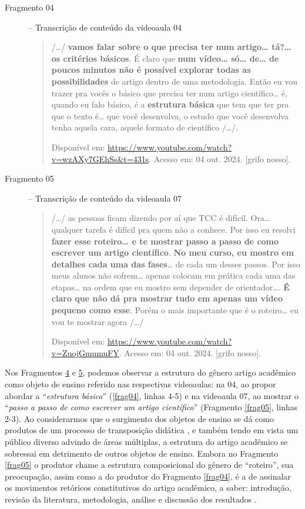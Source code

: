 \begin{description}
    \item[Fragmento 04\label{frag04}] -- Transcrição de conteúdo da videoaula 04

\begin{quote}
/\ldots/ \textbf{vamos falar sobre o que precisa ter num artigo\ldots{}
tá?\ldots{} os critérios básicos}. É claro que \textbf{num vídeo\ldots{}
só\ldots{} de\ldots{} de poucos minutos não é possível explorar todas as
possibilidades} de artigo dentro de uma metodologia. Então eu vou trazer
pra vocês o básico que precisa ter num artigo científico\ldots{} é,
quando eu falo básico, é a \textbf{estrutura básica} que tem que ter pra
que o texto é\ldots{} que você desenvolva, o estudo que você desenvolva
tenha aquela cara, aquele formato de científico /\ldots/.

Disponível em:
\url{https://www.youtube.com/watch?v=wzAXy7GEhSs\&t=431s}.
Acesso em: 04 out. 2024. {[}grifo nosso{]}.
\end{quote}

    \item[Fragmento 05\label{frag05}] -- Transcrição de conteúdo da videoaula 07

\begin{quote}
/\ldots/ as pessoas ficam dizendo por aí que TCC é difícil. Ora\ldots{}
qualquer tarefa é difícil pra quem não a conhece. Por isso eu resolvi
\textbf{fazer esse roteiro\ldots{} e te mostrar passo a passo de como
escrever um artigo científico}. \textbf{No meu curso, eu mostro em
detalhes cada uma das fases}\ldots{} de cada um desses passos. Por isso
meus alunos não sofrem\ldots{} apenas colocam em prática cada uma das
etapas\ldots{} na ordem que eu mostro sem depender de orientador\ldots.
\textbf{É claro que não dá pra mostrar tudo em apenas um vídeo pequeno
como esse}. Porém o mais importante que é o roteiro\ldots{} eu vou te
mostrar agora /\ldots/

Disponível em:
\url{https://www.youtube.com/watch?v=ZuojGmumuFY}.
Acesso em: 04 out. 2024. {[}grifo nosso{]}.
\end{quote}
\end{description}

Nos Fragmentos \hyperref[frag04]{4} e \hyperref[frag05]{5}, podemos observar a estrutura do gênero artigo
acadêmico como objeto de ensino referido nas respectivas videoaulas: na
04, ao propor abordar a ``\emph{estrutura básica}'' (\ref{frag04},
linhas 4-5) e na videoaula 07, ao mostrar o ``\emph{passo a passo de
como escrever um artigo científico}'' (Fragmento \ref{frag05}, linhas 2-3). Ao
considerarmos que o surgimento dos objetos de ensino se dá como produtos
de um processo de transposição didática \cite{linodearaujo2014}, e também
tendo em vista um público diverso advindo de áreas múltiplas, a
estrutura do artigo acadêmico se sobressai em detrimento de outros
objetos de ensino. Embora no Fragmento \ref{frag05} o produtor chame a estrutura
composicional do gênero de ``roteiro'', sua preocupação, assim como a do
produtor do Fragmento \ref{frag04}, é a de assinalar os movimentos retóricos
constitutivos do artigo acadêmico, a saber: introdução, revisão da
literatura, metodologia, análise e discussão dos resultados \cite{motta-roth2010}.

